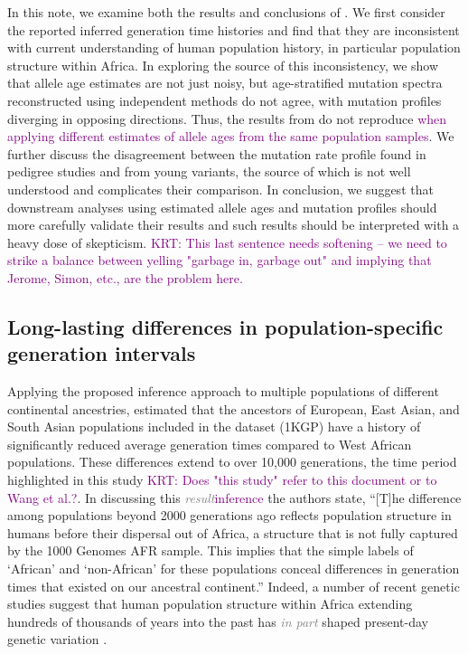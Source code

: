 \documentclass[]{article}
\newcommand{\krtcomment}[1]{{\textcolor{purple}{KRT: #1}}}
\newcommand{\krtedit}[2]{{\emph{\textcolor{gray}{#1}}}{\textcolor{purple}{#2}}}
\begin{document}
In this note, we examine both the results and conclusions of
\citet{wang2023human}. We first consider the reported inferred generation time
histories and find that they are inconsistent with current understanding of
human population history, in particular population structure within Africa. In
exploring the source of this inconsistency, we show that allele age estimates
are not just noisy, but age-stratified mutation spectra reconstructed using
independent methods do not agree, with mutation profiles diverging in opposing
directions. Thus, the results from \citet{wang2023human} do not reproduce
\krtedit{}{when applying different estimates of allele ages from the same population samples}. We
further discuss the disagreement between the mutation rate profile found in
pedigree studies and from young variants, the source of which is not well
understood and complicates their comparison. In conclusion, we suggest that
downstream analyses using estimated allele ages and mutation profiles should
more carefully validate their results and such results should be interpreted
with a heavy dose of skepticism. \krtcomment{This last sentence needs softening -- 
we need to strike a balance between yelling "garbage in, garbage out" and implying
that Jerome, Simon, etc., are the problem here.}

\subsection*{Long-lasting differences in population-specific generation intervals}

Applying the proposed inference approach to multiple populations of different
continental ancestries, \citet{wang2023human} estimated that the ancestors of
European, East Asian, and South Asian populations included in the
\citet{1000genomes2015} dataset (1KGP) have a history of significantly reduced
average generation times compared to West African populations. These
differences extend to over 10,000 generations, the time period highlighted in
this study \krtcomment{Does "this study" refer to this document or to Wang et al.?}.
In discussing this \krtedit{result}{inference} the authors state, ``[T]he difference
among populations beyond 2000 generations ago reflects population structure in
humans before their dispersal out of Africa, a structure that is not fully
captured by the 1000 Genomes AFR sample. This implies that the simple labels of
`African' and `non-African' for these populations conceal differences in
generation times that existed on our ancestral continent.'' Indeed, a number of
recent genetic studies suggest that human population structure within Africa
extending hundreds of thousands of years into the past has \krtedit{in part}{} shaped
present-day genetic variation
\citep{hammer2011genetic,hsieh2016model,hey2018phylogeny,
ragsdale2019models,lorente2019whole,durvasula2020recovering}.
\end{document}
